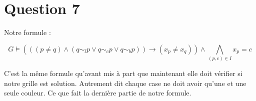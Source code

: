 
\section{Question 7}

Notre formule : 

$$G \models ( ( ( p \neq q ) \wedge ( q \sim_{l} p \vee q \sim_{c} p \vee q \sim_{b} p) ) \rightarrow ( x_p \neq x_q )  ) \wedge \bigwedge_{(p,c) \in I} x_p = c$$

C'est la m\^eme formule qu'avant mis \`a part que maintenant elle doit v\'erifier si notre grille est solution. Autrement dit chaque case ne doit avoir qu'une et une seule couleur. Ce que fait la derni\`ere partie de notre formule.